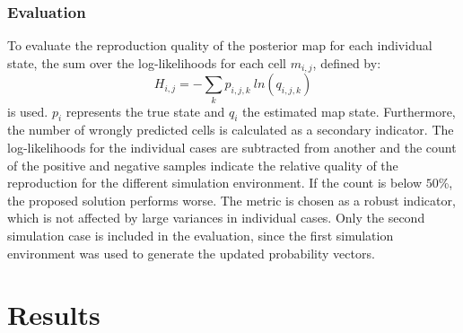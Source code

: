 \documentclass[twocolumn,letterpaper]{IEEEAerospaceCLS}  %
\begin{document}
\subsubsection{Evaluation}\label{ssec:MetEval}
To evaluate the reproduction quality of the posterior map for each individual state, the sum over the log-likelihoods for each cell $m_{i,j}$, defined by:
\begin{equation} \label{eq:Entropy}
    H_{i,j} = - \sum_{k} p_{i,j,k}~ln(q_{i,j,k})
\end{equation}
is used. $p_i$ represents the true state and $q_i$ the estimated map state. Furthermore, the number of wrongly predicted cells is calculated as a secondary indicator.
The log-likelihoods for the individual cases are subtracted from another and the count of the positive and negative samples indicate the relative quality of the reproduction for the different simulation environment. If the count is below $50$\%, the proposed solution performs worse. The metric is chosen as a robust indicator, which is not affected by large variances in individual cases. 
Only the second simulation case is included in the evaluation, since the first simulation environment was used to generate the updated probability vectors.
\section{Results} \label{sec:Res}
\end{document}
